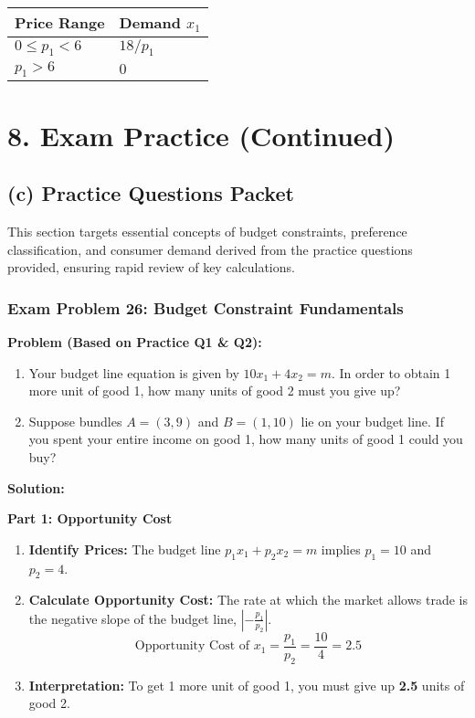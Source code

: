 \documentclass{article}
\begin{document}
\begin{table}[h!]
\centering
\begin{tabular}{ll}
\toprule
\textbf{Price Range} & \textbf{Demand $x_1$} \\
\midrule
$0 \leq p_1 < 6$ & $18/p_1$ \\
$p_1 > 6$ & $0$ \\
\bottomrule
\end{tabular}
\end{table}

\hrulefill

\section*{8. Exam Practice (Continued)}

\subsection*{(c) Practice Questions Packet}

This section targets essential concepts of budget constraints, preference classification, and consumer demand derived from the practice questions provided, ensuring rapid review of key calculations.

\subsubsection*{Exam Problem 26: Budget Constraint Fundamentals}

\textbf{Problem (Based on Practice Q1 \& Q2):}
\begin{enumerate}
    \item Your budget line equation is given by $10x_1 + 4x_2 = m$. In order to obtain 1 more unit of good 1, how many units of good 2 must you give up?
    \item Suppose bundles $A=(3, 9)$ and $B=(1, 10)$ lie on your budget line. If you spent your entire income on good 1, how many units of good 1 could you buy?
\end{enumerate}

\textbf{Solution:}

\textbf{Part 1: Opportunity Cost}
\begin{enumerate}
    \item \textbf{Identify Prices:} The budget line $p_1 x_1 + p_2 x_2 = m$ implies $p_1=10$ and $p_2=4$.
    \item \textbf{Calculate Opportunity Cost:} The rate at which the market allows trade is the negative slope of the budget line, $|-\frac{p_1}{p_2}|$.
    \[\text{Opportunity Cost of } x_1 = \frac{p_1}{p_2} = \frac{10}{4} = 2.5\]
    \item \textbf{Interpretation:} To get 1 more unit of good 1, you must give up \textbf{2.5} units of good 2.
\end{enumerate}
\end{document}
